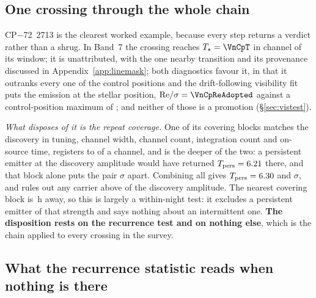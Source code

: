 \subsection{One crossing through the whole chain}

CP$-$72~2713 is the clearest worked example, because every step returns a
verdict rather than a shrug. In Band~7 the crossing reaches
$T_\star=\VnCpT$ in channel \VnCpChan{} of its window; it is unattributed,
with the one nearby transition and its provenance discussed in
Appendix~\ref{app:linemask}; both diagnostics favour it, in that it outranks
every one of the \NCtrl{} control positions and the drift-following
visibility fit puts the emission at the stellar position, ${\rm
Re}/\sigma=\VnCpReAdopted$ against a control-position maximum of
\VnCpCtrlAdopted; and neither of those is a promotion
(\S\ref{sec:vistest}).

\emph{What disposes of it is the repeat coverage.} One of its
\XcCpNRep{} covering blocks matches the discovery in tuning, channel width,
channel count, integration count and on-source time, registers to
\CpRecOffChan{} of a channel, and is the deeper of the two: a persistent
emitter at the discovery amplitude would have returned
$T_{\rm pers}=6.21$ there, and that block alone puts the pair
\XcCpExclOne$\sigma$ apart. Combining all \XcCpNRep{} gives
$T_{\rm pers}=6.30$ and \XcCpExcl$\sigma$, and rules out any carrier
above \XcCpFrac{} of the discovery amplitude. The nearest covering block is
\XcCpSepH\,h away, so this is largely a within-night test: it excludes a
persistent emitter of that strength and says nothing about an intermittent
one. \textbf{The disposition rests on the recurrence test and on nothing
else}, which is the chain applied to every crossing in the survey.

\subsection{What the recurrence statistic reads when nothing is there}

